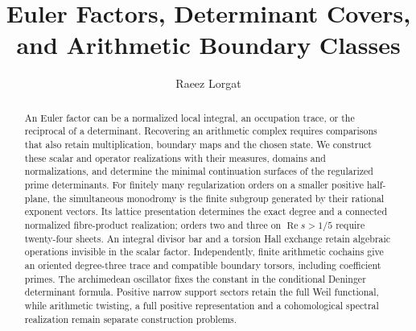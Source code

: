 \documentclass[11pt]{article}
\title{Euler Factors, Determinant Covers, and Arithmetic Boundary Classes}
\author{Raeez Lorgat}
\date{}
\theoremstyle{plain}
\theoremstyle{definition}
\theoremstyle{remark}
\begin{document}
\maketitle
\begin{abstract}
An Euler factor can be a normalized local integral, an occupation trace,
or the reciprocal of a determinant. Recovering an arithmetic complex
requires comparisons that also retain multiplication, boundary maps and
the chosen state. We construct these scalar and operator realizations
with their measures, domains and normalizations, and determine the
minimal continuation surfaces of the regularized prime determinants.
For finitely many regularization orders on a smaller positive half-plane,
the simultaneous monodromy is the finite subgroup generated by their
rational exponent vectors. Its lattice presentation determines the exact
degree and a connected normalized fibre-product realization; orders two
and three on $\operatorname{Re}s>1/5$ require twenty-four sheets.
An integral divisor bar and a torsion Hall exchange retain algebraic
operations invisible in the scalar factor. Independently, finite
arithmetic cochains give an oriented degree-three trace and compatible
boundary torsors, including coefficient primes. The archimedean
oscillator fixes the constant in the conditional Deninger determinant
formula. Positive narrow support sectors retain the full Weil functional,
while arithmetic twisting, a full positive representation and a
cohomological spectral realization remain separate construction problems.
\end{abstract}

\tableofcontents
\newpage



















\end{document}
